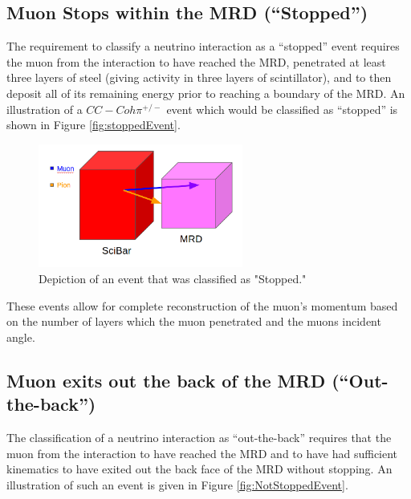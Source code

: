 \documentclass[11pt]{article}
\begin{document}
\subsection{Muon Stops within the MRD (``Stopped'')}\label{subsec:stoppedMRD}
The requirement to classify a neutrino interaction as a ``stopped'' event requires the muon from the interaction to have reached the MRD, penetrated at least three layers of steel (giving activity in three layers of scintillator), and to then deposit all of its remaining energy prior to reaching a boundary of the MRD. An illustration of a $CC-Coh\pi^{+/-}$ event which would be classified as ``stopped'' is shown in Figure \ref{fig:stoppedEvent}.

\begin{figure}[H]
\centering
\includegraphics[width=0.6\textwidth]{EventClassifications/Stopped.png}
\caption{Depiction of an event that was classified as "Stopped."}
\end{figure}\label{fig:stoppedEvent}

These events allow for complete reconstruction of the muon's momentum based on the number of layers which the muon penetrated and the muons incident angle.

\subsection{Muon exits out the back of the MRD (``Out-the-back'')}
The classification of a neutrino interaction as ``out-the-back'' requires that the muon from the interaction to have reached the MRD and to have had sufficient kinematics to have exited out the back face of the MRD without stopping. An illustration of such an event is given in Figure \ref{fig:NotStoppedEvent}. 
\end{document}
